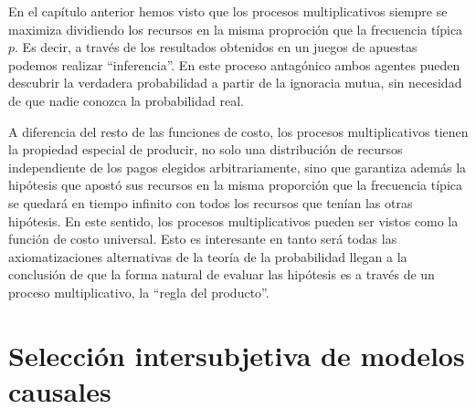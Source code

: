 \documentclass[a4paper,10pt]{book}
\theoremstyle{definition}
\begin{document}

En el cap\'itulo anterior hemos visto que los procesos multiplicativos siempre se maximiza dividiendo los recursos en la misma proproci\'on que la frecuencia t\'ipica $p$.
%
Es decir, a trav\'es de los resultados obtenidos en un juegos de apuestas podemos realizar ``inferencia''.
% 
En este proceso antag\'onico ambos agentes pueden descubrir la verdadera probabilidad a partir de la ignoracia mutua, sin necesidad de que nadie conozca la probabilidad real.


A diferencia del resto de las funciones de costo, los procesos multiplicativos tienen la propiedad especial de producir, no solo una distribuci\'on de recursos independiente de los pagos elegidos arbitrariamente, sino que garantiza adem\'as la hip\'otesis que apost\'o sus recursos en la misma proporci\'on que la frecuencia t\'ipica se quedar\'a en tiempo infinito con todos los recursos que ten\'ian las otras hip\'otesis.
%
En este sentido, los procesos multiplicativos pueden ser vistos como la funci\'on de costo universal.
%
Esto es interesante en tanto ser\'a todas las axiomatizaciones alternativas de la teor\'ia de la probabilidad llegan a la conclusi\'on de que la forma natural de evaluar las hip\'otesis es a trav\'es de un proceso multiplicativo, la ``regla del producto''.

\section{Selecci\'on intersubjetiva de modelos causales}\label{sec:modelos_alternativos}
\end{document}
